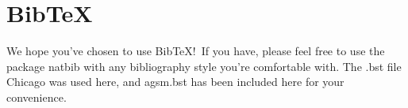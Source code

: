 \documentclass[12pt]{article}
\begin{document}
\section{BibTeX}

We hope you've chosen to use BibTeX!\ If you have, please feel free to use the package natbib with any bibliography style you're comfortable with. The .bst file Chicago was used here, and agsm.bst has been included here for your convenience. 



\end{document}
